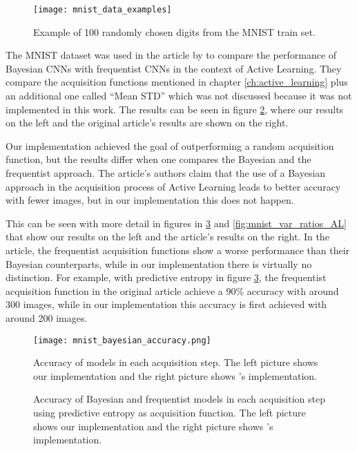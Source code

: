 \begin{figure}[H]
    \centering
    \texttt{[image: mnist\_data\_examples]}
    \caption{Example of 100 randomly chosen digits from the MNIST train set.}
    \label{fig:mnist_data_examples}
\end{figure}

The MNIST dataset was used in the article  by \citeauthor{Gal2016Active} to compare the performance of Bayesian CNNs with frequentist CNNs in the context of Active Learning. They compare the acquisition functions mentioned in chapter \ref{ch:active_learning} plus an additional one called ``Mean STD'' which was not discussed because it was not implemented in this work. The results can be seen in figure \ref{fig:mnist_comparison_active_learning_random}, where our results on the left and the original article's results are shown on the right.

Our implementation achieved the goal of outperforming a random acquisition function, but the results differ when one compares the Bayesian and the frequentist approach. The article's authors claim that the use of a Bayesian approach in the acquisition process of Active Learning leads to better accuracy with fewer images, but in our implementation this does not happen.

This can be seen with more detail in figures in \ref{fig:mnist_pred_entropy_AL} and \ref{fig:mnist_var_ratios_AL} that show our results on the left and the article's results on the right. In the article, the frequentist acquisition functions show a worse performance than their Bayesian counterparts, while in our implementation there is virtually no distinction. For example, with predictive entropy in figure \ref{fig:mnist_pred_entropy_AL}, the frequentist acquisition function in the original article achieve a 90\% accuracy with around 300 images, while in our implementation this accuracy is first achieved with around 200 images.

\begin{figure}[H]
    \centering
    \texttt{[image: mnist\_bayesian\_accuracy.png]}
    \caption{Accuracy of models in each acquisition step. The left picture shows our implementation and the right picture shows \citeauthor{Gal2016Active}'s implementation.}
    \label{fig:mnist_comparison_active_learning_random}
\end{figure}

\begin{figure}[H]
  \centering
  \hfill
  \caption{Accuracy of Bayesian and frequentist models in each acquisition step using predictive entropy as acquisition function. The left picture shows our implementation and the right picture shows \citeauthor{Gal2016Active}'s implementation.}
  \label{fig:mnist_pred_entropy_AL}
\end{figure}


